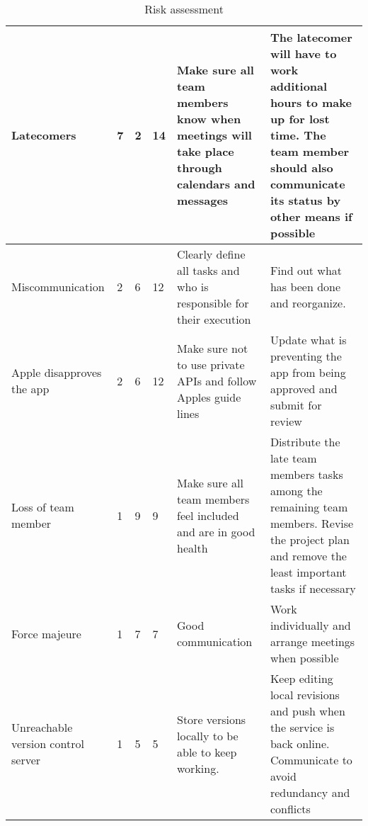 \begin{sidewaystable}[]
\begin{tabular}{|L{3cm}|C{1cm}|C{1cm}|C{.75cm}|L{6cm}|L{9cm}|}
Latecomers & 7 & 2 & 14 & Make sure all team members know when meetings will take place through calendars and messages & The latecomer will have to work additional hours to make up for lost time. The team member should also communicate its status by other means if possible \\ \hline
Miscommunication & 2 & 6 & 12 & Clearly define all tasks and who is responsible for their execution & Find out what has been done and reorganize. \\ \hline
Apple disapproves the app & 2 & 6 & 12 & Make sure not to use private APIs and follow Apples guide lines & Update what is preventing the app from being approved and submit for review \\ \hline
Loss of team member & 1 & 9 & 9 & Make sure all team members feel included and are in good health & Distribute the late team members tasks among the remaining team members. Revise the project plan and remove the least important tasks if necessary \\ \hline
Force majeure & 1 & 7 & 7 & Good communication & Work individually and arrange meetings when possible \\ \hline
Unreachable version control server & 1 & 5 & 5 & Store versions locally to be able to keep working. & Keep editing local revisions and push when the service is back online. Communicate to avoid redundancy and conflicts \\ \hline
\end{tabular}
\caption{Risk assessment}
\label{table:risk-assessment}
\end{sidewaystable}